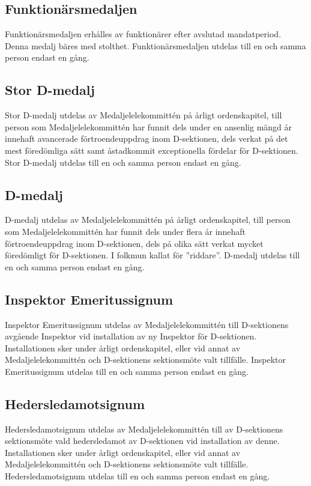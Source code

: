 \documentclass[pdfbookmarks,a4paper,11pt]{article}
\begin{document}
\subsection{Funktionärsmedaljen}
Funktionärsmedaljen erhålles av funktionärer efter avslutad mandatperiod. Denna medalj bäres med stolthet. Funktionärsmedaljen utdelas till en och samma person endast en gång.

\subsection{Stor D-medalj}
Stor D-medalj utdelas av Medaljelelekommittén på årligt ordenskapitel, till person som Medaljelelekommittén har funnit dels under en ansenlig mängd år innehaft avancerade förtroendeuppdrag inom D-sektionen, dels verkat på det mest föredömliga sätt samt åstadkommit exceptionella fördelar för D-sektionen. Stor D-medalj utdelas till en och samma person endast en gång.

\subsection{D-medalj}
D-medalj utdelas av Medaljelelekommittén på årligt ordenskapitel, till person som Medaljelelekommittén har funnit dels under flera år innehaft förtroendeuppdrag inom D-sektionen, dels på olika sätt verkat mycket föredömligt för D-sektionen. I folkmun kallat för ''riddare''. D-medalj utdelas till en och samma person endast en gång.

\subsection{Inspektor Emeritussignum}
Inspektor Emeritussignum utdelas av Medaljelelekommittén till D-sektionens avgående Inspektor vid installation av ny Inspektor för D-sektionen. Installationen sker under årligt ordenskapitel, eller vid annat av Medaljelelekommittén och D-sektionens sektionsmöte valt tillfälle. Inspektor Emeritussignum utdelas till en och samma person endast en gång.

\subsection{Hedersledamotsignum}
Hedersledamotsignum utdelas av Medaljelelekommittén till av D-sektionens sektionsmöte vald hedersledamot av D-sektionen vid installation av denne. Installationen sker under årligt ordenskapitel, eller vid annat av Medaljelelekommittén och D-sektionens sektionsmöte valt tillfälle. Hedersledamotsignum utdelas till en och samma person endast en gång.
\end{document}
